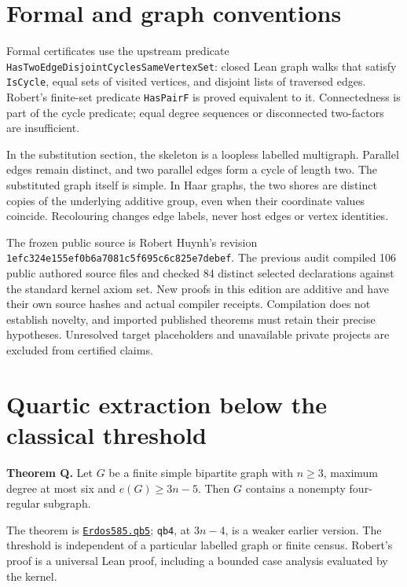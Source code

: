 \documentclass[smallextended]{svjour3}
\newcounter{none} %
\begin{document}
\section{Formal and graph
conventions}\label{formal-and-graph-conventions}

Formal certificates use the upstream predicate
\texttt{HasTwoEdgeDisjointCyclesSameVertexSet}: closed Lean graph walks
that satisfy \texttt{IsCycle}, equal sets of visited vertices, and
disjoint lists of traversed edges. Robert's finite-set predicate
\texttt{HasPairF} is proved equivalent to it. Connectedness is part of
the cycle predicate; equal degree sequences or disconnected two-factors
are insufficient.

In the substitution section, the skeleton is a loopless labelled
multigraph. Parallel edges remain distinct, and two parallel edges form
a cycle of length two. The substituted graph itself is simple. In Haar
graphs, the two shores are distinct copies of the underlying additive
group, even when their coordinate values coincide. Recolouring changes
edge labels, never host edges or vertex identities.

The frozen public source is Robert Huynh's revision
\texttt{1efc324e155ef0b6a7081c5f695c6c825e7debef}. The previous audit
compiled 106 public authored source files and checked 84 distinct
selected declarations against the standard kernel axiom set. New proofs
in this edition are additive and have their own source hashes and actual
compiler receipts. Compilation does not establish novelty, and imported
published theorems must retain their precise hypotheses. Unresolved
target placeholders and unavailable private projects are excluded from
certified claims.

\section{Quartic extraction below the classical
threshold}\label{quartic-extraction-below-the-classical-threshold}

\textbf{Theorem Q.} Let \(G\) be a finite simple bipartite graph with
\(n\geq3\), maximum degree at most six and \(e(G)\geq3n-5\). Then \(G\)
contains a nonempty four-regular subgraph.

The theorem is
\href{https://github.com/alejandrozu/openmath-2026-judging/blob/70c5ec3107658182f22c207d4c50f53f9cb3e602/robert-review-2026-10-07/lean/Openmath/Proofs/QB5/Statement.lean\#L42}{\texttt{Erdos585.qb5}};
\texttt{qb4}, at \(3n-4\), is a weaker earlier version. The threshold is
independent of a particular labelled graph or finite census. Robert's
proof is a universal Lean proof, including a bounded case analysis
evaluated by the kernel.
\end{document}
